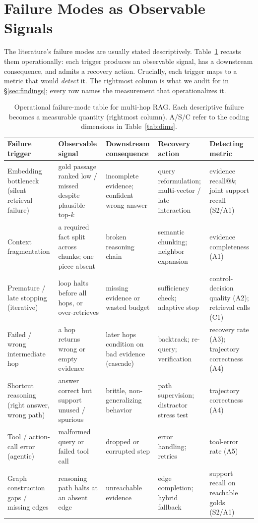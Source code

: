 \documentclass[11pt]{article}
\begin{document}
\section{Failure Modes as Observable Signals}
\label{sec:failuremodes}
The literature's failure modes are usually stated descriptively. Table~\ref{tab:operational} recasts
them operationally: each trigger produces an observable signal, has a downstream consequence, and admits a
recovery action. Crucially, each trigger maps to a metric that would \emph{detect} it. The rightmost column
is what we audit for in \S\ref{sec:findings}; every row names the measurement that operationalizes it.

\begin{table}[t]\centering\footnotesize
\caption{Operational failure-mode table for multi-hop RAG. Each descriptive failure becomes a
measurable quantity (rightmost column). A/S/C refer to the coding dimensions in Table~\ref{tab:dims}.}
\label{tab:operational}
\begin{tabular}{@{}p{2.6cm}p{2.65cm}p{2.5cm}p{2.55cm}p{2.25cm}@{}}
\toprule
\textbf{Failure trigger} & \textbf{Observable signal} & \textbf{Downstream consequence} & \textbf{Recovery action} & \textbf{Detecting metric} \\
\midrule
Embedding bottleneck (silent retrieval failure) & gold passage ranked low / missed despite plausible top-$k$ & incomplete evidence; confident wrong answer & query reformulation; multi-vector / late interaction & evidence recall@$k$; joint support recall (S2/A1) \\
\midrule
Context fragmentation & a required fact split across chunks; one piece absent & broken reasoning chain & semantic chunking; neighbor expansion & evidence completeness (A1) \\
\midrule
Premature / late stopping (iterative) & loop halts before all hops, or over-retrieves & missing evidence or wasted budget & sufficiency check; adaptive stop & control-decision quality (A2); retrieval calls (C1) \\
\midrule
Failed / wrong intermediate hop & a hop returns wrong or empty evidence & later hops condition on bad evidence (cascade) & backtrack; re-query; verification & recovery rate (A3); trajectory correctness (A4) \\
\midrule
Shortcut reasoning (right answer, wrong path) & answer correct but support unused / spurious & brittle, non-generalizing behavior & path supervision; distractor stress test & trajectory correctness (A4) \\
\midrule
Tool / action-call error (agentic) & malformed query or failed tool call & dropped or corrupted step & error handling; retries & tool-error rate (A5) \\
\midrule
Graph construction gaps / missing edges & reasoning path halts at an absent edge & unreachable evidence & edge completion; hybrid fallback & support recall on reachable golds (S2/A1) \\
\bottomrule
\end{tabular}
\end{table}
\end{document}
